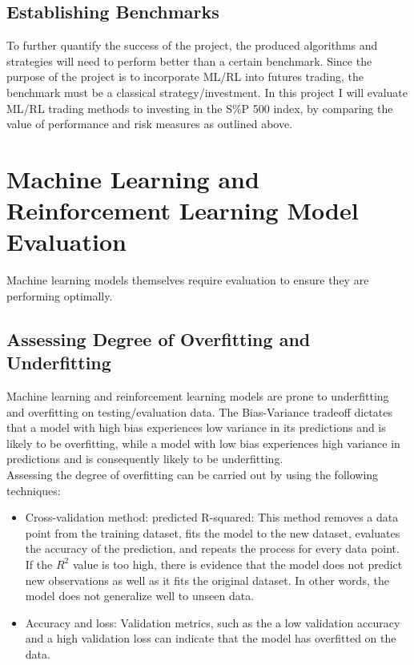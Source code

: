 \subsection{Establishing Benchmarks}
To further quantify the success of the project, the produced algorithms and strategies will need to perform better than a certain benchmark. Since the purpose of the project is to incorporate ML/RL into futures trading, the benchmark must be a classical strategy/investment. In this project I will evaluate ML/RL trading methods to investing in the S\%P 500 index, by comparing the value of performance and risk measures as outlined above.

\section{Machine Learning and Reinforcement Learning Model Evaluation}
Machine learning models themselves require evaluation to ensure they are performing optimally.
\subsection{Assessing Degree of Overfitting and Underfitting}
Machine learning and reinforcement learning models are prone to underfitting and overfitting on testing/evaluation data. The Bias-Variance tradeoff dictates that a model with high bias experiences low variance in its predictions and is likely to be overfitting, while a model with low bias experiences high variance in predictions and is consequently likely to be underfitting. \\

Assessing the degree of overfitting can be carried out by using the following techniques:
\begin{itemize}
\item Cross-validation method: predicted R-squared: This method removes a data point from the training dataset, fits the model to the new dataset, evaluates the accuracy of the prediction, and repeats the process for every data point. If the $R^2$ value is too high, there is evidence that the model does not predict new observations as well as it fits the original dataset. In other words, the model does not generalize well to unseen data.
\item Accuracy and loss: Validation metrics, such as the a low validation accuracy and a high validation loss can indicate that the model has overfitted on the data.
\end{itemize}

